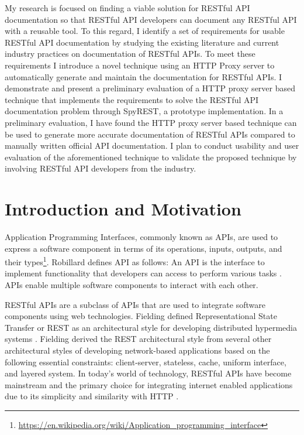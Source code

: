 \documentclass[11pt,oneside]{book}
\begin{document}
My research is focused on finding a viable solution for RESTful API documentation so that RESTful API developers can document any RESTful API with a reusable tool. To this regard, I identify a set of requirements for usable RESTful API documentation by studying the existing literature and current industry practices on documentation of RESTful APIs. To meet these requirements I introduce a novel technique using an HTTP Proxy server to automatically generate and maintain the documentation for RESTful APIs. I demonstrate and present a preliminary evaluation of a HTTP proxy server based technique that implements the requirements to solve the RESTful API documentation problem through SpyREST, a prototype implementation. In a preliminary evaluation, I have found the HTTP proxy server based technique can be used to generate more accurate documentation of RESTful APIs compared to manually written official API documentation. I plan to conduct usability and user evaluation of the aforementioned technique to validate the proposed technique by involving RESTful API developers from the industry.

\section{Introduction and Motivation}

Application Programming Interfaces, commonly known as APIs, are used to express a software component in terms of its operations, inputs, outputs, and their types\footnote{\url{https://en.wikipedia.org/wiki/Application_programming_interface}}. Robillard defines API as follows: An API is the interface to implement functionality that developers can access to perform various tasks \cite{Robillard_a_field_study} \cite{Robillard_what_makes}. APIs enable multiple software components to interact with each other.

RESTful APIs are a subclass of APIs that are used to integrate software components using web technologies. Fielding defined Representational State Transfer or REST as an architectural style for developing distributed hypermedia systems \cite{Fielding_rest}. Fielding derived the REST architectural style from several other architectural styles of developing network-based applications based on the following essential constraints: client-server, stateless, cache, uniform interface, and layered system. In today’s world of technology, RESTful APIs have become mainstream and the primary choice for integrating internet enabled applications due to its simplicity and similarity with HTTP \cite{mangler2010origin}.
\end{document}
